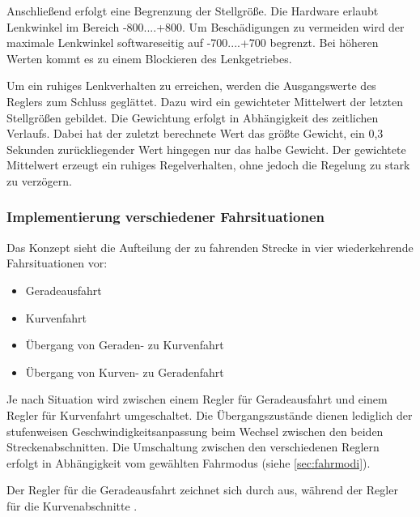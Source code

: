 

Anschließend erfolgt eine Begrenzung der Stellgröße. Die Hardware erlaubt Lenkwinkel im Bereich -800....+800. Um Beschädigungen zu vermeiden wird der maximale Lenkwinkel softwareseitig auf -700....+700 begrenzt. Bei höheren Werten kommt es zu einem Blockieren des Lenkgetriebes.

Um ein ruhiges Lenkverhalten zu erreichen, werden die Ausgangswerte des Reglers zum Schluss geglättet. Dazu wird ein gewichteter Mittelwert der letzten Stellgrößen gebildet. Die Gewichtung erfolgt in Abhängigkeit des zeitlichen Verlaufs. Dabei hat der zuletzt berechnete Wert das größte Gewicht, ein 0,3 Sekunden zurückliegender Wert hingegen nur das halbe Gewicht. Der gewichtete Mittelwert erzeugt ein ruhiges Regelverhalten, ohne jedoch die Regelung zu stark zu verzögern.



\subsubsection{Implementierung verschiedener Fahrsituationen}
\label{sec:fahrsituationen}
Das Konzept sieht die Aufteilung der zu fahrenden Strecke in vier wiederkehrende Fahrsituationen vor:

\begin{itemize}
	\item Geradeausfahrt
	\item Kurvenfahrt
	\item Übergang von Geraden- zu Kurvenfahrt
	\item Übergang von Kurven- zu Geradenfahrt
\end{itemize}

Je nach Situation wird zwischen einem Regler für Geradeausfahrt und einem Regler für Kurvenfahrt umgeschaltet. Die Übergangszustände dienen lediglich der stufenweisen Geschwindigkeitsanpassung beim Wechsel zwischen den beiden Streckenabschnitten. Die Umschaltung zwischen den verschiedenen Reglern erfolgt in Abhängigkeit vom gewählten Fahrmodus (siehe \autoref{sec:fahrmodi}).

Der Regler für die Geradeausfahrt zeichnet sich durch  aus, während der Regler für die Kurvenabschnitte .


